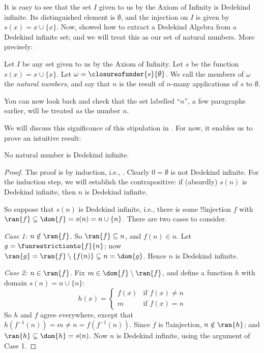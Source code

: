 \documentclass[../../../include/open-logic-section]{subfiles}
\begin{document}
It is easy to see that the set $I$ given to us by the Axiom of
Infinity is Dedekind infinite. Its distinguished element is
$\emptyset$, and the injection on $I$ is given by $s(x) = x\cup
\{x\}$. Now,
 showed
how to extract a Dedekind Algebra from a Dedekind infinite set; and we
will treat this as our set of natural numbers. More precisely:
\begin{defn}
Let $I$ be any set given to us by the Axiom of Infinity. Let $s$
be the function $s(x) = x \cup \{x\}$. Let $\omega =
\closureofunder{s}{\emptyset}$. We call the members of $\omega$ the
\emph{natural numbers}, and say that $n$ is the result of $n$-many
applications of $s$ to $\emptyset$.
\end{defn}

You can now look back and check that the set labelled ``$n$'', a few
paragraphs earlier, will be treated \emph{as} the number $n$. 

We will discuss this significance of this stipulation in
. For now, it enables us to prove an
intuitive result:

\begin{prop}
No natural number is Dedekind infinite.
\end{prop}

\begin{proof}
The proof is by induction, i.e.,
. Clearly $0
= \emptyset$ is not Dedekind infinite. For the induction step, we will
establish the contrapositive: if (absurdly) $s(n)$ is Dedekind
infinite, then $n$ is Dedekind infinite. 

So suppose that $s(n)$ is Dedekind infinite, i.e., there is some
!!{injection} $f$ with $\ran{f}\subsetneq \dom{f} = s(n) = n \cup
\{n\}$. There are two cases to consider. 

\emph{Case 1: $n \notin \ran{f}$.} So $\ran{f} \subseteq n$, and $f(n) \in n$. Let $g = \funrestrictionto{f}{n}$; now $\ran{g} =
\ran{f} \setminus \{f(n)\} \subsetneq n = \dom{g}$. Hence $n$ is
Dedekind infinite. 

\emph{Case 2: $n \in \ran{f}$.} Fix $m \in \dom{f} \setminus \ran{f}$, and define a function $h$ with domain $s(n) = n \cup \{n\}$:
\[
h(x) = 
	\begin{cases}
		f(x) & \text{if }f(x) \neq n\\
		m & \text{if }f(x)=n
	\end{cases}
\]
So $h$ and $f$ agree everywhere, except that $h(f^{-1}(n)) = m
\neq n = f(f^{-1}(n))$. Since $f$ is !!a{injection}, $n \notin
\ran{h}$; and $\ran{h} \subsetneq \dom{h} = s(n)$. Now $n$ is
Dedekind infinite, using the argument of Case 1.
\end{proof}
\end{document}
